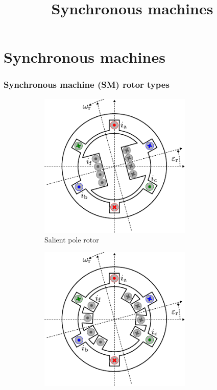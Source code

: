 \section{Synchronous machines}
\title[Synchronous machines]{Synchronous machines}  

\begin{frame}[plain]
    \titlepage
\end{frame}

\begin{frame}
	\frametitle{Synchronous machine (SM) rotor types}
	\begin{figure}
		\centering
		\begin{subfigure}{0.49\textwidth}
			\centering
			\includegraphics[width=0.8\textwidth]{fig/lec07/SM_salient_pole.pdf}
			\caption{Salient pole rotor}
		\end{subfigure}
		\hfill
		\begin{subfigure}{0.49\textwidth}
			\centering
			\includegraphics[width=0.8\textwidth]{fig/lec07/SM_cylindrical_rotor.pdf}

\end{subfigure}
\end{figure}
\end{frame}
